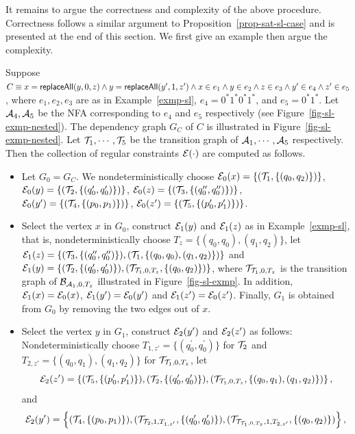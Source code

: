It remains to argue the correctness and complexity of the above procedure.
Correctness follows a similar argument to Proposition~\ref{prop-sat-sl-case} and is presented at the end of this section.
We first give an example then argue the complexity.

\begin{example}
Suppose $C \equiv x= \mathsf{replaceAll}(y, 0, z) \wedge y = \mathsf{replaceAll}(y', 1, z') \wedge x \in e_1 \wedge y \in e_2 \wedge z \in e_3 \wedge y' \in e_4  \wedge z' \in e_5$, where $e_1, e_2, e_3$ are as in Example~\ref{exmp-sl}, $e_4=0^* 1^* 0^* 1^*$, and $e_5=0^*1^*$. Let $\mathcal{A}_4,\mathcal{A}_5$ be the NFA corresponding to $e_4$ and $e_5$ respectively (see Figure~\ref{fig-sl-exmp-nested}). The dependency graph $G_C$ of $C$ is illustrated in Figure~\ref{fig-sl-exmp-nested}. Let $\mathcal{T}_1,\cdots, \mathcal{T}_5$ be the transition graph of $\mathcal{A}_1,\cdots, \mathcal{A}_5$ respectively. Then the collection of regular constraints $\mathcal{E}(\cdot)$ are computed as follows.
\begin{itemize}
\item Let $G_0=G_C$. We nondeterministically choose $\mathcal{E}_0(x) = \{(\mathcal{T}_1, \{(q_0, q_2)\})\}$, $\mathcal{E}_0(y) = \{(\mathcal{T}_2, \{(q^\prime_0, q^\prime_0)\})\}$, $\mathcal{E}_0(z) = \{(\mathcal{T}_3, \{(q^{\prime\prime}_0, q^{\prime\prime}_0)\})\}$, $\mathcal{E}_0(y^\prime) = \{(\mathcal{T}_4, \{(p_0, p_1)\})\}$, $\mathcal{E}_0(z^\prime) = \{(\mathcal{T}_5, \{(p^{\prime}_0, p^{\prime}_1)\})\}$.
%
\item Select the vertex $x$ in $G_0$, construct $\mathcal{E}_1(y)$ and $\mathcal{E}_1(z)$ as in Example~\ref{exmp-sl}, that is, nondeterministically choose $T_z =\{(q_0, q_0), (q_1,q_2)\}$, let $\mathcal{E}_1(z) = \{(\mathcal{T}_3, \{(q^{\prime\prime}_0, q^{\prime\prime}_0)\}), (\mathcal{T}_1, \{(q_0,q_0), (q_1, q_2)\})\}$ and $\mathcal{E}_1(y)=\{(\mathcal{T}_2, \{(q^\prime_0, q^\prime_0)\}), (\mathcal{T}_{\mathcal{T}_1, 0, T_z}, \{(q_0,q_2)\})\}$, where $\mathcal{T}_{\mathcal{T}_1, 0, T_z}$ is the transition graph of $\mathcal{B}_{\mathcal{A}_1, 0, T_z}$ illustrated in Figure~\ref{fig-sl-exmp}. In addition, $\mathcal{E}_1(x)=\mathcal{E}_0(x)$, $\mathcal{E}_1(y')=\mathcal{E}_0(y')$ and $\mathcal{E}_1(z')=\mathcal{E}_0(z')$. Finally, $G_1$ is obtained from $G_0$ by removing the two edges out of $x$.
%
\item Select the vertex $y$ in $G_1$, construct $\mathcal{E}_2(y')$ and $\mathcal{E}_2(z')$ as follows: Nondeterministically choose $T_{1,z'} = \{(q^\prime_0, q^\prime_0)\}$  for $\mathcal{T}_2$ and $T_{2,z'}=\{(q_0,q_1),(q_1,q_2)\}$ for $\mathcal{T}_{\mathcal{T}_1, 0, T_z}$, let
$$\mathcal{E}_2(z')=\left\{(\mathcal{T}_5, \{(p^{\prime}_0, p^{\prime}_1)\}), (\mathcal{T}_2, \{(q^\prime_0, q^\prime_0)\}), (\mathcal{T}_{\mathcal{T}_1, 0, T_z}, \{(q_0,q_1),(q_1,q_2)\}) \right\},$$
and
$$\mathcal{E}_2(y')=\left\{ (\mathcal{T}_4, \{(p_0, p_1)\}), (\mathcal{T}_{\mathcal{T}_2, 1, T_{1,z'}}, \{(q^\prime_0, q^\prime_0)\}), (\mathcal{T}_{\mathcal{T}_{\mathcal{T}_1, 0, T_z}, 1, T_{2,z'}}, \{(q_0,q_2)\}) \right\},$$

\end{itemize}
\end{example}
